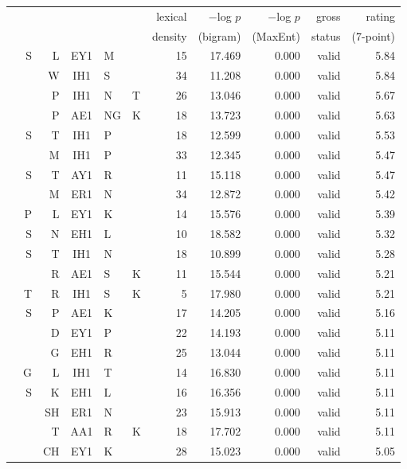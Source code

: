\begin{longtable}{r@{ }r@{ }r@{ }c@{ }l@{ }l@{ } rrrrr}
\toprule
   &    &    &    &    &   & lexical & $-$log $p$ & $-$log $p$ & gross  & rating    \\
   &    &    &    &    &   & density & (bigram)   & (MaxEnt)   & status & (7-point) \\
\midrule
  &  S &  L & EY1 & M  &    & 15 & 17.469 & 0.000 &   valid & 5.84 \\
  &    &  W & IH1 & S  &    & 34 & 11.208 & 0.000 &   valid & 5.84 \\
  &    &  P & IH1 & N  & T  & 26 & 13.046 & 0.000 &   valid & 5.67 \\
  &    &  P & AE1 & NG & K  & 18 & 13.723 & 0.000 &   valid & 5.63 \\
  &  S &  T & IH1 & P  &    & 18 & 12.599 & 0.000 &   valid & 5.53 \\
  &    &  M & IH1 & P  &    & 33 & 12.345 & 0.000 &   valid & 5.47 \\
  &  S &  T & AY1 & R  &    & 11 & 15.118 & 0.000 &   valid & 5.47 \\
  &    &  M & ER1 & N  &    & 34 & 12.872 & 0.000 &   valid & 5.42 \\
  &  P &  L & EY1 & K  &    & 14 & 15.576 & 0.000 &   valid & 5.39 \\
  &  S &  N & EH1 & L  &    & 10 & 18.582 & 0.000 &   valid & 5.32 \\
  &  S &  T & IH1 & N  &    & 18 & 10.899 & 0.000 &   valid & 5.28 \\
  &    &  R & AE1 & S  & K  & 11 & 15.544 & 0.000 &   valid & 5.21 \\
  &  T &  R & IH1 & S  & K  &  5 & 17.980 & 0.000 &   valid & 5.21 \\
  &  S &  P & AE1 & K  &    & 17 & 14.205 & 0.000 &   valid & 5.16 \\
  &    &  D & EY1 & P  &    & 22 & 14.193 & 0.000 &   valid & 5.11 \\
  &    &  G & EH1 & R  &    & 25 & 13.044 & 0.000 &   valid & 5.11 \\
  &  G &  L & IH1 & T  &    & 14 & 16.830 & 0.000 &   valid & 5.11 \\
  &  S &  K & EH1 & L  &    & 16 & 16.356 & 0.000 &   valid & 5.11 \\
  &    & SH & ER1 & N  &    & 23 & 15.913 & 0.000 &   valid & 5.11 \\
  &    &  T & AA1 & R  & K  & 18 & 17.702 & 0.000 &   valid & 5.11 \\
  &    & CH & EY1 & K  &    & 28 & 15.023 & 0.000 &   valid & 5.05 \\

\end{longtable}
